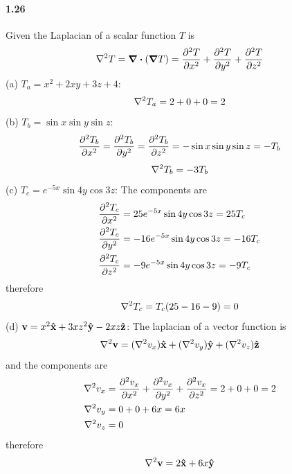 \documentclass[../main.tex]{subfiles}
\begin{document}
\paragraph{1.26}
Given the Laplacian of a scalar function $T$ is
\begin{align*}
    \laplacian{T} = \div(\grad{T}) = \pdv[2]{T}{x} + \pdv[2]{T}{y} + \pdv[2]{T}{z}
\end{align*}
(a) $T_a = x^2 + 2xy + 3z + 4$:
\begin{align*}
    \laplacian{T_a} = 2 + 0 + 0 = 2
\end{align*}
(b) $T_b = \sin{x} \sin{y} \sin{z}$:
\begin{align*}
    \pdv[2]{T_b}{x} = \pdv[2]{T_b}{y} = \pdv[2]{T_b}{z} = -\sin{x} \sin{y} \sin{z} = -T_b
\end{align*}
\begin{align*}
    \laplacian{T_b} = -3T_b
\end{align*}
(c) $T_c = e^{-5x} \sin{4y} \cos{3z}$: The components are
\begin{align*}
    \pdv[2]{T_c}{x} &= 25e^{-5x} \sin{4y} \cos{3z} = 25T_c \\
    \pdv[2]{T_c}{y} &= -16e^{-5x} \sin{4y} \cos{3z} = -16T_c \\
    \pdv[2]{T_c}{z} &= -9e^{-5x} \sin{4y} \cos{3z} = -9T_c
\end{align*}
therefore
\begin{align*}
    \laplacian{T_c} = T_c(25 - 16 - 9) = 0
\end{align*}
(d) $\vb{v} = x^2 \vu{x} + 3xz^2 \vu{y} - 2xz \vu{z}$: The laplacian of a vector function is
\begin{align*}
    \laplacian{\vb{v}} = (\laplacian{v}_x) \vu{x} + (\laplacian{v_y}) \vu{y}
        + (\laplacian{v_z}) \vu{z}
\end{align*}
and the components are
\begin{align*}
    \laplacian{v}_x &= \pdv[2]{v_x}{x} + \pdv[2]{v_x}{y} + \pdv[2]{v_x}{z} = 2 + 0 + 0 = 2 \\
    \laplacian{v}_y &= 0 + 0 + 6x = 6x \\
    \laplacian{v}_z &= 0
\end{align*}
therefore
\begin{align*}
    \laplacian{\vb{v}} = 2\vu{x} + 6x\vu{y}
\end{align*}
\end{document}
